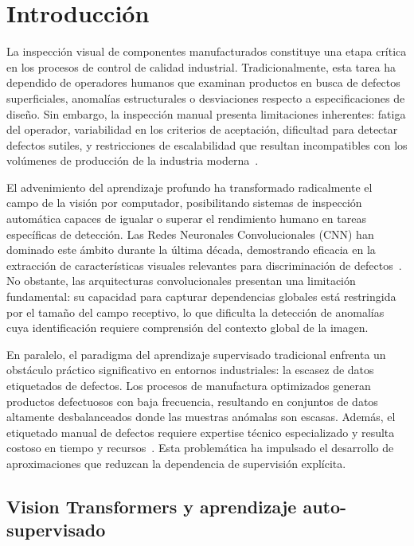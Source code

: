 \chapter{Introducción} 
\label{ch:introduccion}

La inspección visual de componentes manufacturados constituye una etapa crítica en los procesos de control de calidad industrial. Tradicionalmente, esta tarea ha dependido de operadores humanos que examinan productos en busca de defectos superficiales, anomalías estructurales o desviaciones respecto a especificaciones de diseño. Sin embargo, la inspección manual presenta limitaciones inherentes: fatiga del operador, variabilidad en los criterios de aceptación, dificultad para detectar defectos sutiles, y restricciones de escalabilidad que resultan incompatibles con los volúmenes de producción de la industria moderna~\cite{alber2024evaluating}.

El advenimiento del aprendizaje profundo ha transformado radicalmente el campo de la visión por computador, posibilitando sistemas de inspección automática capaces de igualar o superar el rendimiento humano en tareas específicas de detección. Las Redes Neuronales Convolucionales (\acrshort{CNN}) han dominado este ámbito durante la última década, demostrando eficacia en la extracción de características visuales relevantes para discriminación de defectos~\cite{wang2022defect}. No obstante, las arquitecturas convolucionales presentan una limitación fundamental: su capacidad para capturar dependencias globales está restringida por el tamaño del campo receptivo, lo que dificulta la detección de anomalías cuya identificación requiere comprensión del contexto global de la imagen.

En paralelo, el paradigma del aprendizaje supervisado tradicional enfrenta un obstáculo práctico significativo en entornos industriales: la escasez de datos etiquetados de defectos. Los procesos de manufactura optimizados generan productos defectuosos con baja frecuencia, resultando en conjuntos de datos altamente desbalanceados donde las muestras anómalas son escasas. Además, el etiquetado manual de defectos requiere expertise técnico especializado y resulta costoso en tiempo y recursos~\cite{huang2025semiconductor}. Esta problemática ha impulsado el desarrollo de aproximaciones que reduzcan la dependencia de supervisión explícita.


\section{Vision Transformers y aprendizaje auto-supervisado}
\label{sec:vit-ssl}

